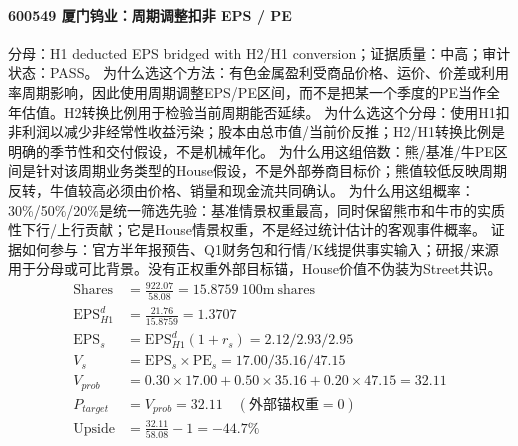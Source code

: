 \paragraph{600549 厦门钨业：周期调整扣非 EPS / PE}
分母：H1 deducted EPS bridged with H2/H1 conversion；证据质量：中高；审计状态：PASS。
为什么选这个方法：有色金属盈利受商品价格、运价、价差或利用率周期影响，因此使用周期调整EPS/PE区间，而不是把某一个季度的PE当作全年估值。H2转换比例用于检验当前周期能否延续。
为什么选这个分母：使用H1扣非利润以减少非经常性收益污染；股本由总市值/当前价反推；H2/H1转换比例是明确的季节性和交付假设，不是机械年化。
为什么用这组倍数：熊/基准/牛PE区间是针对该周期业务类型的House假设，不是外部券商目标价；熊值较低反映周期反转，牛值较高必须由价格、销量和现金流共同确认。
为什么用这组概率：30\%/50\%/20\%是统一筛选先验：基准情景权重最高，同时保留熊市和牛市的实质性下行/上行贡献；它是House情景权重，不是经过统计估计的客观事件概率。
证据如何参与：官方半年报预告、Q1财务包和行情/K线提供事实输入；研报/来源用于分母或可比背景。没有正权重外部目标锚，House价值不伪装为Street共识。
\begin{align*}
\mathrm{Shares} &= \frac{922.07}{58.08}=15.8759\ \mathrm{100m\ shares}\\
\mathrm{EPS}_{H1}^d &= \frac{21.76}{15.8759}=1.3707\\
\mathrm{EPS}_s &= \mathrm{EPS}_{H1}^d(1+r_s)=2.12/2.93/2.95\\
V_s &= \mathrm{EPS}_s\times \mathrm{PE}_s=17.00/35.16/47.15\\
V_{prob} &= 0.30\times 17.00+0.50\times 35.16+0.20\times 47.15=32.11\\
P_{target} &= V_{prob}=32.11\quad(\text{外部锚权重}=0)\\
\mathrm{Upside} &= \frac{32.11}{58.08}-1=-44.7\%\\
\end{align*}

